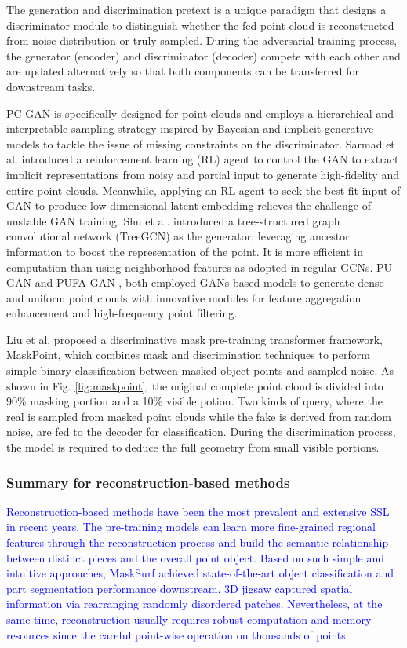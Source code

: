 \documentclass[a4paper,fleqn]{cas-dc}
\begin{document}
The generation and discrimination pretext is a unique paradigm that designs a discriminator module to distinguish whether the fed point cloud is reconstructed from noise distribution or truly sampled. During the adversarial training process, the generator (encoder) and discriminator (decoder) compete with each other and are updated alternatively so that both components can be transferred for downstream tasks.

PC-GAN \citep{li2018point} is specifically designed for point clouds and employs a hierarchical and interpretable sampling strategy inspired by Bayesian and implicit generative models to tackle the issue of missing constraints on the discriminator. Sarmad et al. \citep{sarmad2019rl} introduced a reinforcement learning (RL) agent to control the GAN to extract implicit representations from noisy and partial input to generate high-fidelity and entire point clouds. Meanwhile, applying an RL agent to seek the best-fit input of GAN to produce low-dimensional latent embedding relieves the challenge of unstable GAN training. Shu et al. \citep{shu20193d} introduced a tree-structured graph convolutional network (TreeGCN) as the generator, leveraging ancestor information to boost the representation of the point. It is more efficient in computation than using neighborhood features as adopted in regular GCNs. PU-GAN \citep{li2019pu} and PUFA-GAN \citep{liu2022pufa}, both employed GANs-based models to generate dense and uniform point clouds with innovative modules for feature aggregation enhancement and high-frequency point filtering.

Liu et al. \citep{liu2022masked} proposed a discriminative mask pre-training transformer framework, MaskPoint, which combines mask and discrimination techniques to perform simple binary classification between masked object points and sampled noise. As shown in Fig. \ref{fig:maskpoint}, the original complete point cloud is divided into 90\% masking portion and a 10\% visible potion. Two kinds of query, where the real is sampled from masked point clouds while the fake is derived from random noise, are fed to the decoder for classification. During the discrimination process, the model is required to deduce the full geometry from small visible portions.

\subsubsection{Summary for reconstruction-based methods}
\textcolor{blue}{
Reconstruction-based methods have been the most prevalent and extensive SSL in recent years. The pre-training models can learn more fine-grained regional features through the reconstruction process and build the semantic relationship between distinct pieces and the overall point object. Based on such simple and intuitive approaches, MaskSurf \citep{zhang2022masked} achieved state-of-the-art object classification and part segmentation performance downstream. 3D jigsaw \citep{sauder2019self} captured spatial information via rearranging randomly disordered patches. Nevertheless, at the same time, reconstruction usually requires robust computation and memory resources since the careful point-wise operation on thousands of points.}
\end{document}
